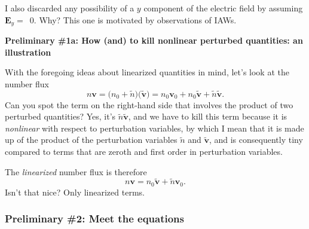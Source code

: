 I also discarded any possibility of a $y$ component of the electric field by
assuming $\mathbf{E}_y =$~0. Why? This one is motivated by observations of IAWs.

\textbf{Preliminary \#1a:  How (and) to kill nonlinear perturbed quantities: an illustration}

With the foregoing ideas about linearized quantities in mind, let's look at the
number flux
\begin{equation}
  n \mathbf{v} = \Big ( n_0 + \tilde n \Big ) \Big ( \mathbf{\tilde v} \Big ) = n_0 \mathbf{v}_0 + n_0 \mathbf{\tilde v} + \tilde n \mathbf{\tilde v}.
\end{equation}
Can you spot the term on the right-hand side that involves the product of two
perturbed quantities? Yes, it's $\tilde n \mathbf{\tilde v}$, and we have to
kill this term because it is \emph{nonlinear} with respect to perturbation
variables, by which I mean that it is made up of the product of the perturbation
variables $\tilde n$ and $\mathbf{\tilde v}$, and is consequently tiny compared
to terms that are zeroth and first order in perturbation variables.

The \emph{linearized} number flux is therefore
\begin{equation}
  n \mathbf{v} = n_0 \mathbf{\tilde v} + \tilde n \mathbf{v}_0.
\end{equation}
Isn't that nice? Only linearized terms.

\subsubsection{Preliminary \#2: Meet the equations}

